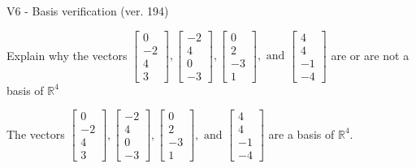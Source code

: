 \begin{exercise}
  \begin{exerciseTitle}V6 - Basis verification (ver. 194)\end{exerciseTitle}
  \begin{exerciseStatement}
    Explain why the vectors \(\left[\begin{array}{r}
0 \\
-2 \\
4 \\
3
\end{array}\right] , \left[\begin{array}{r}
-2 \\
4 \\
0 \\
-3
\end{array}\right] , \left[\begin{array}{r}
0 \\
2 \\
-3 \\
1
\end{array}\right] , \text{ and } \left[\begin{array}{r}
4 \\
4 \\
-1 \\
-4
\end{array}\right]\) are or are not a basis of \(\mathbb{R}^4\)	


  \end{exerciseStatement}
  \begin{exerciseAnswer}
   The vectors \(\left[\begin{array}{r}
0 \\
-2 \\
4 \\
3
\end{array}\right] , \left[\begin{array}{r}
-2 \\
4 \\
0 \\
-3
\end{array}\right] , \left[\begin{array}{r}
0 \\
2 \\
-3 \\
1
\end{array}\right] , \text{ and } \left[\begin{array}{r}
4 \\
4 \\
-1 \\
-4
\end{array}\right]\) 
  	 are  a basis of \(\mathbb{R}^4\).
  


  \end{exerciseAnswer}
\end{exercise}